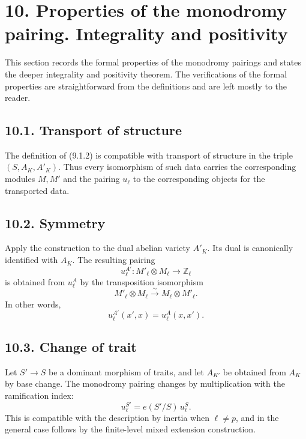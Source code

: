 \documentclass[11pt]{article}
\newcommand{\Z}{\mathbb Z}
\begin{document}
\section*{10. Properties of the monodromy pairing.  Integrality and positivity}

This section records the formal properties of the monodromy pairings and states the deeper integrality and positivity theorem.  The verifications of the formal properties are straightforward from the definitions and are left mostly to the reader.

\subsection*{10.1. Transport of structure}
The definition of (9.1.2) is compatible with transport of structure in the triple \((S,A_K,A'_K)\).  Thus every isomorphism of such data carries the corresponding modules \(M,M'\) and the pairing \(u_\ell\) to the corresponding objects for the transported data.

\subsection*{10.2. Symmetry}
Apply the construction to the dual abelian variety \(A'_K\).  Its dual is canonically identified with \(A_K\).  The resulting pairing
\begin{equation}\tag{10.2.1}
        u_\ell^{A'}:M'_\ell\otimes M_\ell\longrightarrow \Z_\ell
\end{equation}
is obtained from \(u_\ell^A\) by the transposition isomorphism
\[
        M'_\ell\otimes M_\ell\xrightarrow{\sim}M_\ell\otimes M'_\ell .
\]
In other words,
\begin{equation}\tag{10.2.2}
        u_\ell^{A'}(x',x)=u_\ell^{A}(x,x').
\end{equation}

\subsection*{10.3. Change of trait}
Let \(S'\to S\) be a dominant morphism of traits, and let \(A_{K'}\) be obtained from \(A_K\) by base change.  The monodromy pairing changes by multiplication with the ramification index:
\begin{equation}\tag{10.3.4}
        u_\ell^{S'}=e(S'/S)\,u_\ell^{S}.
\end{equation}
This is compatible with the description by inertia when \(\ell\ne p\), and in the general case follows by the finite-level mixed extension construction.
\end{document}
